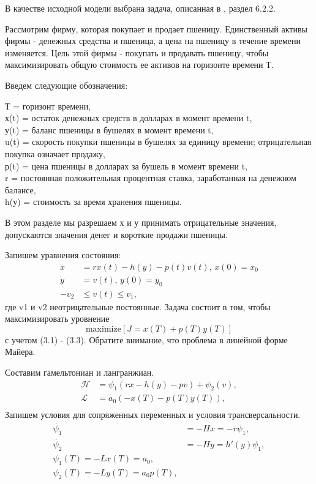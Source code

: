 
В качестве исходной модели выбрана задача, описанная в \cite{sethi_optimal_2000}, раздел 6.2.2.

Рассмотрим фирму, которая покупает и продает пшеницу. Единственный активы фирмы - денежных средства и пшеница, а цена на пшеницу в течение времени изменяется. Цель этой фирмы - покупать и продавать пшеницу, чтобы максимизировать общую стоимость ее активов на горизонте времени Т.  

Введем следующие обозначения:
 
{Т} = горизонт времени,\\
{х(t)} = остаток денежных средств в долларах в момент времени t,\\
{у(t)} = баланс пшеницы в бушелях в момент времени t,\\ 
{u(t)} = скорость покупки пшеницы в бушелях за единицу времени; отрицательная покупка означает продажу,\\
{р(t)} = цена пшеницы в долларах за бушель в момент времени t,\\
{r} = постоянная положительная процентная ставка, заработанная на денежном балансе,\\
{h(у)} = стоимость за время хранения пшеницы.
 
В этом разделе мы разрешаем {х} и {у} принимать отрицательные значения, допускаются значения денег и короткие продажи пшеницы.



Запишем уравнения состояния:
\begin{align}
    \Dot{x} & = r x(t) - h(y) - p(t) v(t),\, x(0) = x_{0} \\
    \Dot{y} & = v(t), \, y(0) = y_{0} \\
    - v_2 & \le v(t) \le v_1,
\end{align}    
где {v1} и {v2} неотрицательные постоянные. Задача состоит в том, чтобы максимизировать уровнение
\[
  \mathrm{maximize} [J = x(T) + p(T) y(T)]
\]
с учетом (3.1) - (3.3). Обратите внимание, что проблема в линейной форме Майера.


Составим гамельтониан и лангранжиан. 
\begin{align}
    \mathcal{H} & = \psi_{1} (r x - h(y) - p v) + \psi_{2} (v),\\
    \mathcal{L} & = a_{0} (-x(T) - p(T) y(T)),\\
\end{align} 
Запишем условия для сопряженных переменных и условия трансверсальности.
\begin{align}
    \Dot{\psi_{1}} & = -H x = -r \psi_{1},\\
    \Dot{\psi_{2}} & = -H y = h'(y) \psi_{1},\\
    {\psi_{1}(T)} = - {L}x(T)=a_{0},\\
    {\psi_{2}(T)} = - {L}y(T)=a_{0} p(T),
\end{align} 

